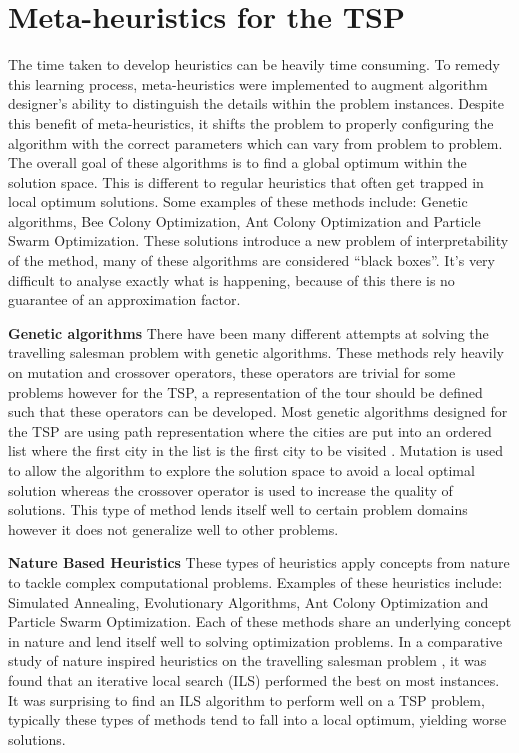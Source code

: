 \documentclass[]{UCD_CS_FYP_Report}
\begin{document}
\newpage
\section{Meta-heuristics for the TSP}
The time taken to develop heuristics can be heavily time consuming. To remedy this learning process, meta-heuristics were implemented to augment algorithm designer’s ability to distinguish the details within the problem instances. Despite this benefit of meta-heuristics, it shifts the problem to properly configuring the algorithm with the correct parameters which can vary from problem to problem. The overall goal of these algorithms is to find a global optimum within the solution space. This is different to regular heuristics that often get trapped in local optimum solutions. Some examples of these methods include: Genetic algorithms, Bee Colony Optimization, Ant Colony Optimization and Particle Swarm Optimization. These solutions introduce a new problem of interpretability of the method, many of these algorithms are considered “black boxes”. It’s very difficult to analyse exactly what is happening, because of this there is no guarantee of an approximation factor.

\textbf{Genetic algorithms}
There have been many different attempts at solving the travelling salesman problem with genetic algorithms. These methods rely heavily on mutation and crossover operators, these operators are trivial for some problems however for the TSP, a representation of the tour should be defined such that these operators can be developed. Most genetic algorithms designed for the TSP are using path representation where the cities are put into an ordered list where the first city in the list is the first city to be visited \cite{Larranaga1999}. Mutation is used to allow the algorithm to explore the solution space to avoid a local optimal solution whereas the crossover operator is used to increase the quality of solutions. This type of method lends itself well to certain problem domains however it does not generalize well to other problems.

\textbf{Nature Based Heuristics}
These types of heuristics apply concepts from nature to tackle complex computational problems. Examples of these heuristics include: Simulated Annealing, Evolutionary Algorithms, Ant Colony Optimization and Particle Swarm Optimization. Each of these methods share an underlying concept in nature and lend itself well to solving optimization problems. In a comparative study of nature inspired heuristics on the travelling salesman problem \cite{NatureBasedHeuristics}, it was found that an iterative local search (ILS) performed the best on most instances. It was surprising to find an ILS algorithm to perform well on a TSP problem, typically these types of methods tend to fall into a local optimum, yielding worse solutions.
\end{document}
